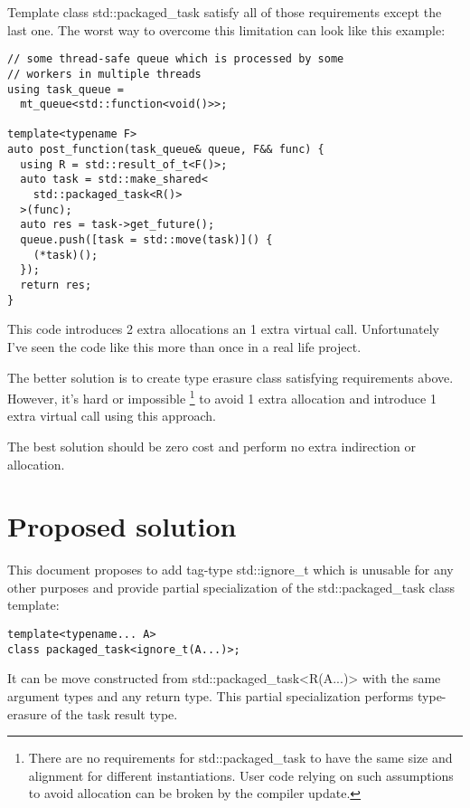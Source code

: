 \documentclass[ebook,openany,10pt,oneside,final]{memoir}
\begin{document}
Template class \mbox{std::packaged_task} satisfy all of those requirements
except the last one. The worst way to overcome this limitation can look like
this example:

\begin{lstlisting}
// some thread-safe queue which is processed by some
// workers in multiple threads
using task_queue =
  mt_queue<std::function<void()>>;

template<typename F>
auto post_function(task_queue& queue, F&& func) {
  using R = std::result_of_t<F()>;
  auto task = std::make_shared<
    std::packaged_task<R()>
  >(func);
  auto res = task->get_future();
  queue.push([task = std::move(task)]() {
    (*task)();
  });
  return res;
}
\end{lstlisting}

This code introduces 2 extra allocations an 1 extra virtual call. Unfortunately
I've seen the code like this more than once in a real life project.

The better solution is to create type erasure class satisfying requirements
above. However, it's hard or impossible \footnote{There are no requirements for
\mbox{std::packaged_task} to have the same size and alignment for different
instantiations. User code relying on such assumptions to avoid allocation can
be broken by the compiler update.} to avoid 1 extra allocation and introduce 1
extra virtual call using this approach.

The best solution should be zero cost and perform no extra indirection or
allocation.

\section{Proposed solution}

This document proposes to add tag-type \mbox{std::ignore_t} which is unusable
for any other
purposes and provide partial specialization of the \mbox{std::packaged_task}
class template:

\begin{lstlisting}
template<typename... A>
class packaged_task<ignore_t(A...)>;
\end{lstlisting}

It can be move constructed from \mbox{std::packaged_task<R(A...)>} with the
same argument types and any return type. This partial specialization performs
type-erasure of the task result type.
\end{document}

